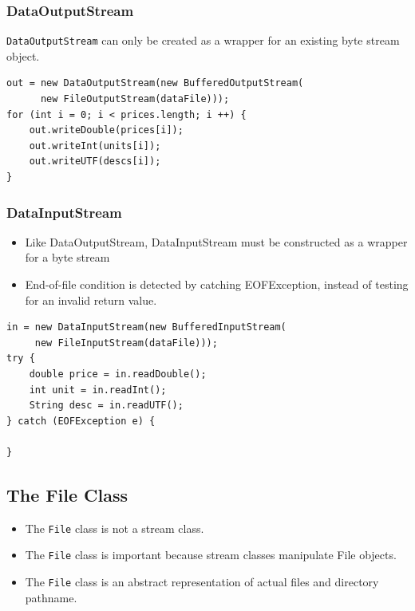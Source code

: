 \documentclass[11pt,a4paper]{article}
\begin{document}
\subsubsection*{DataOutputStream}
\texttt{DataOutputStream} can only be created as a wrapper for an existing byte stream object. 
\begin{lstlisting}[numbers=none, xleftmargin=.25in]
out = new DataOutputStream(new BufferedOutputStream( 
      new FileOutputStream(dataFile))); 
for (int i = 0; i < prices.length; i ++) { 
    out.writeDouble(prices[i]); 
    out.writeInt(units[i]);
    out.writeUTF(descs[i]); 
} 
\end{lstlisting}


\subsubsection*{DataInputStream}
\begin{itemize}
    \item Like DataOutputStream, DataInputStream must be constructed as a wrapper for a byte stream
    \item End-of-file condition is detected by catching EOFException, instead of testing for an invalid return value.
\end{itemize}
\begin{lstlisting}[numbers=none, xleftmargin=.25in]
in = new DataInputStream(new BufferedInputStream( 
     new FileInputStream(dataFile))); 
try { 
    double price = in.readDouble(); 
    int unit = in.readInt(); 
    String desc = in.readUTF(); 
} catch (EOFException e) { 

} 
\end{lstlisting}

\subsection*{The File Class}
\begin{itemize}
    \item The \texttt{File} class is not a stream class. 
    \item The \texttt{File} class is important because stream classes manipulate File objects. 
    \item The \texttt{File} class is an abstract representation of actual files and directory pathname. 
\end{itemize}
\end{document}
